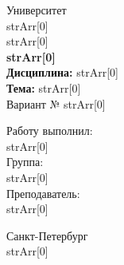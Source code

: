 \documentclass[12pt,a4paper]{scrartcl}
\begin{document}
\begin{titlepage}
\begin{center}

\large
Университет %
\\
strArr[0] %
\\
strArr[0] %
\\[5.5cm]


\large \textbf{
strArr[0] %
}\\
\large \textbf{Дисциплина:}
strArr[0] %
\\
\large \textbf{Тема:}
strArr[0] %
\\
\large Вариант №
strArr[0] %
\\ [3.7cm]


\end{center}

\vfill

\hfill\begin{minipage}{0.25\textwidth}
  Работу выполнил:\\
strArr[0] %
  \\
  Группа:\\
strArr[0] %
    \\
    Преподаватель:\\
strArr[0] %
    \\
\end{minipage}%

\vfill

\begin{center}
\large Санкт-Петербург %
\\
strArr[0] %
\end{center} 

\end{titlepage}
\end{document}
